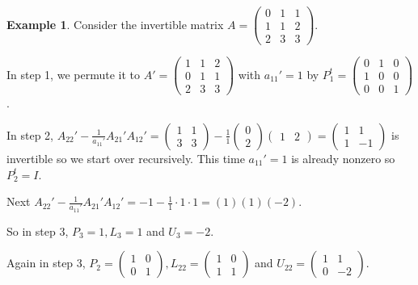 \documentclass[12pt]{amsart}
\theoremstyle{definition}
\newtheorem{example}[theorem]{Example}
\begin{document}
\begin{example} Consider the invertible matrix $A = \left(\begin{array}{ccc} 0 & 1 & 1\\ 1 & 1 & 2\\ 2 & 3 &3\end{array}\right)$.

In step 1, we permute it to $A' = \left(\begin{array}{ccc} 1 & 1 & 2 \\ 0 & 1 & 1\\ 2 & 3 & 3\end{array}\right)$ with $a_{11}' = 1$ by $P^t_1 = \left(\begin{array}{ccc} 0 & 1 & 0 \\ 1 & 0 & 0 \\ 0 & 0 &1 \end{array}\right)$.

In step 2, $A_{22}' - \frac{1}{a_{11}'} A_{21}' A_{12}' = \left(\begin{array}{cc} 1 & 1 \\ 3 & 3 \end{array}\right) - \frac{1}{1}\left(\begin{array}{c} 0 \\ 2 \end{array}\right)\left(\begin{array}{cc} 1 & 2 \end{array}\right) = \left(\begin{array}{cc} 1 & 1 \\ 1 & -1 \end{array}\right)$ is invertible so we start over recursively. This time $a_{11}' = 1$ is already nonzero so $P_2^t = I$.

Next $A_{22}' - \frac{1}{a_{11}'} A_{21}' A_{12}' = -1 - \frac{1}{1}\cdot 1 \cdot 1 = (1)(1)(-2)$.

So in step 3, $P_3 = 1, L_3 = 1$ and $U_3 = -2$.

Again in step 3, $P_2 = \left(\begin{array}{cc} 1 & 0 \\ 0 & 1 \end{array}\right), L_{22} = \left(\begin{array}{cc} 1 & 0 \\ 1 & 1 \end{array}\right)$ and $U_{22} = \left(\begin{array}{cc} 1 & 1 \\ 0 & -2 \end{array}\right)$.


\end{example}
\end{document}
